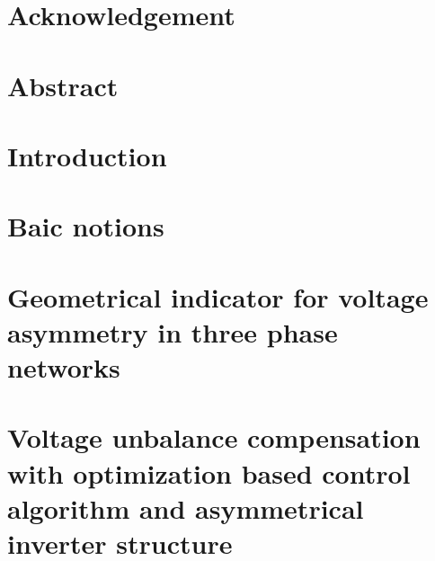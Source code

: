 \documentclass[12pt, a4paper, oneside, table]{report}
\begin{document}

 \null
 \thispagestyle{empty}%
 \addtocounter{page}{-1}%
 \newpage

 

 

 \chapter*{Acknowledgement}
 

% 

 \chapter*{Abstract}
 

 \thispagestyle{plain}
 \tableofcontents
 \newpage

\chapter{Introduction}
 
 
 

 \chapter{Baic notions}

 
 

 
	\chapter{Geometrical indicator for voltage asymmetry in three phase networks}
	
	\chapter{Voltage unbalance compensation with optimization based control algorithm and asymmetrical inverter structure}
	
\end{document}

